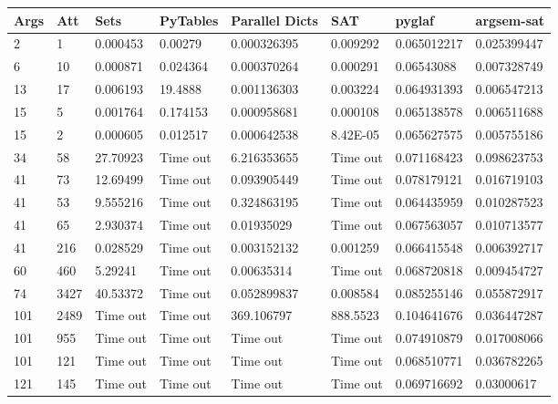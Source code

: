 %
\begin{landscape}
\begin{longtabu} {|l|l|l|l|l|l|l|l|}
\toprule
Args & Att & Sets     & PyTables & Parallel Dicts & SAT      & pyglaf      & argsem-sat  \\ \midrule
\endhead

2         & 1       & 0.000453 & 0.00279  & 0.000326395    & 0.009292 & 0.065012217 & 0.025399447 \\
6         & 10      & 0.000871 & 0.024364 & 0.000370264    & 0.000291 & 0.06543088  & 0.007328749 \\
13        & 17      & 0.006193 & 19.4888  & 0.001136303    & 0.003224 & 0.064931393 & 0.006547213 \\
15        & 5       & 0.001764 & 0.174153 & 0.000958681    & 0.000108 & 0.065138578 & 0.006511688 \\
15        & 2       & 0.000605 & 0.012517 & 0.000642538    & 8.42E-05 & 0.065627575 & 0.005755186 \\
34        & 58      & 27.70923 & Time out & 6.216353655    & Time out & 0.071168423 & 0.098623753 \\
41        & 73      & 12.69499 & Time out & 0.093905449    & Time out & 0.078179121 & 0.016719103 \\
41        & 53      & 9.555216 & Time out & 0.324863195    & Time out & 0.064435959 & 0.010287523 \\
41        & 65      & 2.930374 & Time out & 0.01935029     & Time out & 0.067563057 & 0.010713577 \\
41        & 216     & 0.028529 & Time out & 0.003152132    & 0.001259 & 0.066415548 & 0.006392717 \\
60        & 460     & 5.29241  & Time out & 0.00635314     & Time out & 0.068720818 & 0.009454727 \\
74        & 3427    & 40.53372 & Time out & 0.052899837    & 0.008584 & 0.085255146 & 0.055872917 \\
101       & 2489    & Time out & Time out & 369.106797     & 888.5523 & 0.104641676 & 0.036447287 \\
101       & 955     & Time out & Time out & Time out       & Time out & 0.074910879 & 0.017008066 \\
101       & 121     & Time out & Time out & Time out       & Time out & 0.068510771 & 0.036782265 \\
121       & 145     & Time out & Time out & Time out       & Time out & 0.069716692 & 0.03000617  \\

\end{longtabu}
\end{landscape}
